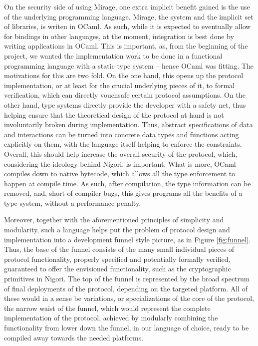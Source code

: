 On the security side of using Mirage, one extra implicit benefit gained is the use of the underlying programming language.
Mirage, the system and the implicit set of libraries, is writen in OCaml.
As such, while it is expected to eventually allow for bindings in other languages, at the moment, integration is best done by writing applications in OCaml.
This is important, as, from the beginning of the project, we wanted the implementation work to be done in a functional programming language with a static type system -- hence OCaml was fitting.
The motivations for this are two fold.
On the one hand, this opens up the protocol implementation, or at least for the crucial underlying pieces of it, to formal verification, which can directly vouchsafe certain protocol assumptions.
On the other hand, type systems directly provide the developer with a safety net, thus helping ensure that the theoretical design of the protocol at hand is not involuntarily broken during implementation.
Thus, abstract specifications of data and interactions can be turned into concrete data types and functions acting explicitly on them, with the language itself helping to enforce the constraints.
Overall, this should help increase the overall security of the protocol, which, considering the ideology behind Nigori, is important.
What is more, OCaml compiles down to native bytecode, which allows all the type enforcement to happen at compile time.
As such, after compilation, the type information can be removed, and, short of compiler bugs, this gives programs all the benefits of a type system, without a performance penalty.

Moreover, together with the aforementioned principles of simplicity and modularity, such a language helps put the problem of protocol design and implementation into a development funnel style picture, as in Figure \ref{fig:funnel}.
Thus, the base of the funnel consists of the many small individual pieces of protocol functionality, properly specified and potentially formally verified, guaranteed to offer the envisioned functionality, such as the cryptographic primitives in Nigori.
The top of the funnel is represented by the broad spectrum of final deployments of the protocol, depending on the targeted platform.
All of these would in a sense be variations, or specializations of the core of the protocol, the narrow waist of the funnel, which would represent the complete implementation of the protocol, achieved by modularly combining the functionality from lower down the funnel, in our language of choice, ready to be compiled away towards the needed platforms.

